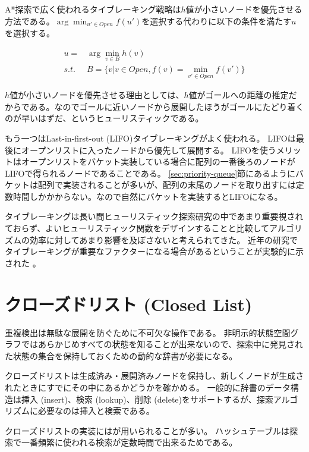 A*探索で広く使われるタイブレーキング戦略は$h$値が小さいノードを優先させる方法である。$\arg \min_{u' \in Open} f(u')$を選択する代わりに以下の条件を満たす$u$を選択する。

\begin{align*}
  u =& \arg \min_{v \in B} h(v) \\
  s.t. \; \; & B = \{v | v \in Open, f(v) = \min_{v' \in Open} f(v')\}
\end{align*}

$h$値が小さいノードを優先させる理由としては、$h$値がゴールへの距離の推定だからである。なのでゴールに近いノードから展開したほうがゴールにたどり着くのが早いはずだ、というヒューリスティックである。

もう一つはLast-in-first-out (LIFO)タイブレーキングがよく使われる。
LIFOは最後にオープンリストに入ったノードから優先して展開する。
LIFOを使うメリットはオープンリストをバケット実装している場合に配列の一番後ろのノードがLIFOで得られるノードであることである。
\ref{sec:priority-queue}節にあるようにバケットは配列で実装されることが多いが、配列の末尾のノードを取り出すには定数時間しかかからない。なので自然にバケットを実装するとLIFOになる。


タイブレーキングは長い間ヒューリスティック探索研究の中であまり重要視されておらず、よいヒューリスティック関数をデザインすることと比較してアルゴリズムの効率に対してあまり影響を及ぼさないと考えられてきた。
近年の研究でタイブレーキングが重要なファクターになる場合があるということが実験的に示された \cite{asai2016tiebreaking}。


\section{クローズドリスト (Closed List)}
\label{sec:closed-list}

重複検出は無駄な展開を防ぐために不可欠な操作である。
非明示的状態空間グラフではあらかじめすべての状態を知ることが出来ないので、探索中に発見された状態の集合を保持しておくための動的な辞書が必要になる。

クローズドリストは生成済み・展開済みノードを保持し、新しくノードが生成されたときにすでにその中にあるかどうかを確かめる。
一般的に辞書のデータ構造は挿入 (insert)、検索 (lookup)、削除 (delete)をサポートするが、探索アルゴリズムに必要なのは挿入と検索である。

クローズドリストの実装にはが用いられることが多い。
ハッシュテーブルは探索で一番頻繁に使われる検索が定数時間で出来るためである。


